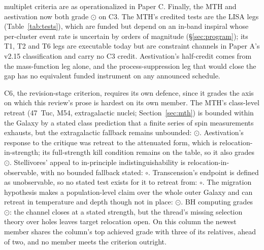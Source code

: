\documentclass[11pt]{article}
\newcommand{\shalf}{\ensuremath{\odot}} %
\newcommand{\snone}{\ensuremath{\circ}}     %
\begin{document}
multiplet criteria are as operationalized in Paper C. Finally, the MTH and aestivation now both grade \shalf{} on C3. The MTH's credited tests are the LISA legs (Table~\ref{tab:tests}), which are funded but depend on an in-band inspiral whose per-cluster event rate is uncertain by orders of magnitude (\S\ref{sec:program}); its T1, T2 and T6 legs are executable today but are constraint channels in Paper A's v2.15 classification and carry no C3 credit. Aestivation's half-credit comes from the mass-function leg alone, and the process-suppression leg that would close the gap has no equivalent funded instrument on any announced schedule.

C6, the revision-stage criterion, requires its own defence, since it grades the axis on which this review's prose is hardest on its own member. The MTH's class-level retreat (47~Tuc, M54, extragalactic nuclei; Section~\ref{sec:mth}) is bounded within the Galaxy by a stated class prediction that a finite series of spin measurements exhausts, but the extragalactic fallback remains unbounded: \shalf. Aestivation's response to the \citet{Bennett2019} critique was retreat to the attenuated form, which is relocation-in-strength; its full-strength kill condition remains on the table, so it also grades \shalf. Stellivores' appeal to in-principle indistinguishability is relocation-in-observable, with no bounded fallback stated: \snone. Transcension's endpoint is defined as unobservable, so no stated test exists for it to retreat from: \snone. The migration hypothesis makes a population-level claim over the whole outer Galaxy and can retreat in temperature and depth though not in place: \shalf. BH computing grades \shalf: the \citet{Dvali2023} channel closes at a stated strength, but the thread's missing selection theory over holes leaves target relocation open. On this column the newest member shares the column's top achieved grade with three of its relatives, ahead of two, and no member meets the criterion outright.
\end{document}
